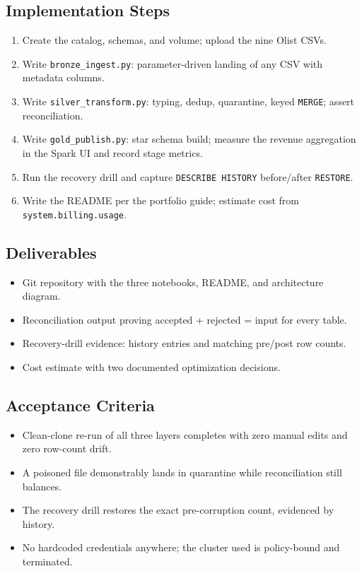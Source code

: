 \subsection*{Implementation Steps}
\begin{enumerate}
    \item Create the catalog, schemas, and volume; upload the nine Olist CSVs.
    \item Write \texttt{bronze\_ingest.py}: parameter-driven landing of any CSV with metadata columns.
    \item Write \texttt{silver\_transform.py}: typing, dedup, quarantine, keyed \texttt{MERGE}; assert reconciliation.
    \item Write \texttt{gold\_publish.py}: star schema build; measure the revenue aggregation in the Spark UI and record stage metrics.
    \item Run the recovery drill and capture \texttt{DESCRIBE HISTORY} before/after \texttt{RESTORE}.
    \item Write the README per the portfolio guide; estimate cost from \texttt{system.billing.usage}.
\end{enumerate}

\subsection*{Deliverables}
\begin{itemize}
    \item Git repository with the three notebooks, README, and architecture diagram.
    \item Reconciliation output proving accepted + rejected = input for every table.
    \item Recovery-drill evidence: history entries and matching pre/post row counts.
    \item Cost estimate with two documented optimization decisions.
\end{itemize}

\subsection*{Acceptance Criteria}
\begin{itemize}
    \item Clean-clone re-run of all three layers completes with zero manual edits and zero row-count drift.
    \item A poisoned file demonstrably lands in quarantine while reconciliation still balances.
    \item The recovery drill restores the exact pre-corruption count, evidenced by history.
    \item No hardcoded credentials anywhere; the cluster used is policy-bound and terminated.
\end{itemize}

